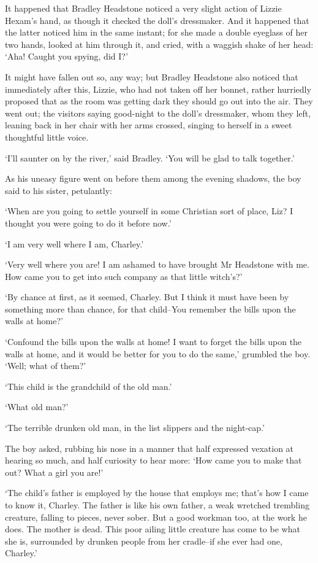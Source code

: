 It happened that Bradley Headstone noticed a very slight action of
Lizzie Hexam’s hand, as though it checked the doll’s dressmaker. And it
happened that the latter noticed him in the same instant; for she made
a double eyeglass of her two hands, looked at him through it, and cried,
with a waggish shake of her head: ‘Aha! Caught you spying, did I?’

It might have fallen out so, any way; but Bradley Headstone also noticed
that immediately after this, Lizzie, who had not taken off her bonnet,
rather hurriedly proposed that as the room was getting dark they should
go out into the air. They went out; the visitors saying good-night to
the doll’s dressmaker, whom they left, leaning back in her chair with
her arms crossed, singing to herself in a sweet thoughtful little voice.

‘I’ll saunter on by the river,’ said Bradley. ‘You will be glad to talk
together.’

As his uneasy figure went on before them among the evening shadows, the
boy said to his sister, petulantly:

‘When are you going to settle yourself in some Christian sort of place,
Liz? I thought you were going to do it before now.’

‘I am very well where I am, Charley.’

‘Very well where you are! I am ashamed to have brought Mr Headstone with
me. How came you to get into such company as that little witch’s?’

‘By chance at first, as it seemed, Charley. But I think it must have
been by something more than chance, for that child--You remember the
bills upon the walls at home?’

‘Confound the bills upon the walls at home! I want to forget the bills
upon the walls at home, and it would be better for you to do the same,’
grumbled the boy. ‘Well; what of them?’

‘This child is the grandchild of the old man.’

‘What old man?’

‘The terrible drunken old man, in the list slippers and the night-cap.’

The boy asked, rubbing his nose in a manner that half expressed vexation
at hearing so much, and half curiosity to hear more: ‘How came you to
make that out? What a girl you are!’

‘The child’s father is employed by the house that employs me; that’s how
I came to know it, Charley. The father is like his own father, a weak
wretched trembling creature, falling to pieces, never sober. But a good
workman too, at the work he does. The mother is dead. This poor ailing
little creature has come to be what she is, surrounded by drunken people
from her cradle--if she ever had one, Charley.’

